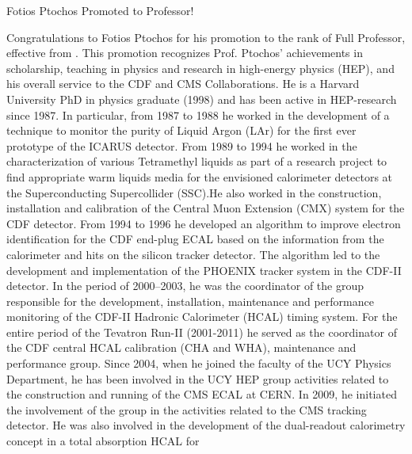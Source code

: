 \begin{headline}[enhanced, tikz={rotate=0}, width=1.0\textwidth]{Fotios Ptochos Promoted to Professor!}
\begin{multicols}{2}
    Congratulations to Fotios Ptochos for his promotion to the rank of
    Full Professor, effective from \MyDate. This promotion recognizes
    Prof. Ptochos' achievements in scholarship, teaching in physics
    and research in high-energy physics (HEP), and his overall service
    to the CDF and CMS Collaborations. He is a Harvard University PhD
    in physics graduate (1998) and has been active in HEP-research%
    since 1987. In particular, from 1987 to 1988 he worked in the development of
    a technique to monitor the purity of Liquid Argon (LAr) for the
    first ever prototype of the ICARUS detector.
    From 1989 to 1994 he worked in the characterization of
    various Tetramethyl liquids as part of a research project to find
    appropriate warm liquids media for the envisioned calorimeter
    detectors at the Superconducting Supercollider (SSC).He also
    worked in the construction, installation and 
    calibration of the Central Muon Extension (CMX) system for the CDF
    detector. From 1994 to 1996 he developed an algorithm to improve
    electron identification for the CDF end-plug ECAL based on the
    information from the calorimeter and hits on the silicon tracker
    detector. The algorithm led to the development and implementation of
    the PHOENIX tracker system in the CDF-II detector. 
    In the period of 2000–2003, he was the coordinator of the group
    responsible for the development, installation, maintenance and
    performance monitoring of the CDF-II Hadronic Calorimeter (HCAL)
    timing system. For the entire period of the Tevatron Run-II
    (2001-2011) he served as the coordinator of the CDF central HCAL
    calibration (CHA and WHA), maintenance and performance group. Since
    2004, when he joined the faculty of the UCY Physics Department, he has
    been involved in the UCY HEP group activities related to the
    construction and running of the CMS ECAL at CERN. In 2009, he
    initiated the involvement of the group in the activities related to
    the CMS tracking detector. He was also involved in the development of
    the dual-readout calorimetry concept in a total absorption HCAL for

\end{multicols}
\end{headline}
